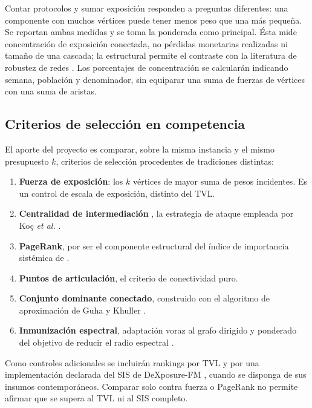 \documentclass[journal]{IEEEtran}
\begin{document}
Contar protocolos y sumar exposición responden a preguntas diferentes: una
componente con muchos vértices puede tener menos peso que una más pequeña.
Se reportan ambas medidas y se toma la ponderada como principal. Ésta mide
concentración de exposición conectada, no pérdidas monetarias realizadas ni
tamaño de una cascada; la estructural permite el contraste con la literatura
de robustez de redes \cite{albert2000error}. Los porcentajes de concentración
se calcularán indicando semana, población y denominador, sin equiparar una suma
de fuerzas de vértices con una suma de aristas.

\subsection{Criterios de selección en competencia}

El aporte del proyecto es comparar, sobre la misma instancia y el mismo
presupuesto $k$, criterios de selección procedentes de tradiciones distintas:

\begin{enumerate}
\item \textbf{Fuerza de exposición}: los $k$ vértices de mayor suma de pesos
      incidentes. Es un control de escala de exposición, distinto del TVL.
\item \textbf{Centralidad de intermediación} \cite{freeman1977betweenness}, la
      estrategia de ataque empleada por Koç \emph{et al.}
      \cite{koc2014topological}.
\item \textbf{PageRank}, por ser el componente estructural del índice de
      importancia sistémica de \cite{shu2026dexposurefm}.
\item \textbf{Puntos de articulación}, el criterio de conectividad puro.
\item \textbf{Conjunto dominante conectado}, construido con el algoritmo de
      aproximación de Guha y Khuller \cite{guha1998approximation}.
\item \textbf{Inmunización espectral}, adaptación voraz al grafo dirigido y
      ponderado del objetivo de reducir el radio espectral \cite{chen2016node}.
\end{enumerate}

Como controles adicionales se incluirán rankings por TVL y por una
implementación declarada del SIS de DeXposure-FM \cite{shu2026dexposurefm},
cuando se disponga de sus insumos contemporáneos. Comparar solo contra fuerza
o PageRank no permite afirmar que se supera al TVL ni al SIS completo.
\end{document}
